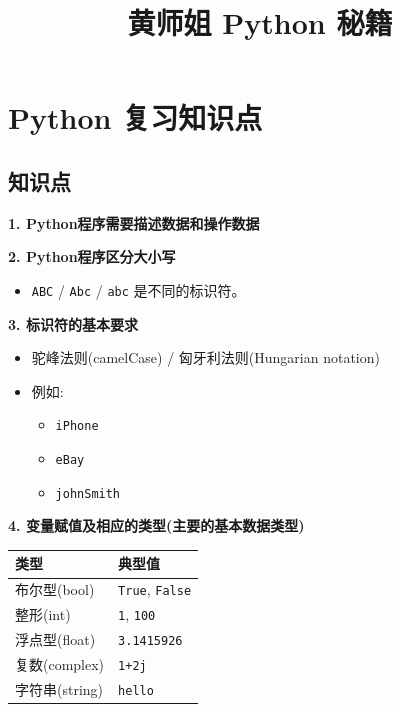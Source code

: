 \documentclass[11pt]{article}
\title{黄师姐 Python 秘籍}
\providecommand{\tightlist}{%
      \setlength{\itemsep}{0pt}\setlength{\parskip}{0pt}}
\begin{document}
    
    \maketitle
    
    

    
    \hypertarget{python-ux590dux4e60ux77e5ux8bc6ux70b9}{%
\section{Python
复习知识点}\label{python-ux590dux4e60ux77e5ux8bc6ux70b9}}

\hypertarget{ux77e5ux8bc6ux70b9}{%
\subsection{知识点}\label{ux77e5ux8bc6ux70b9}}

\textbf{1. Python程序需要描述数据和操作数据}

\textbf{2. Python程序区分大小写}

\begin{itemize}
\tightlist
\item
  \texttt{ABC} / \texttt{Abc} / \texttt{abc} 是不同的标识符。
\end{itemize}

\textbf{3. 标识符的基本要求}

\begin{itemize}
\tightlist
\item
  驼峰法则(camelCase) / 匈牙利法则(Hungarian notation)
\item
  例如:

  \begin{itemize}
  \tightlist
  \item
    \texttt{iPhone}
  \item
    \texttt{eBay}
  \item
    \texttt{johnSmith}
  \end{itemize}
\end{itemize}

\textbf{4. 变量赋值及相应的类型(主要的基本数据类型)}

    \begin{longtable}[]{@{}ll@{}}
\toprule
类型 & 典型值 \\
\midrule
\endhead
布尔型(bool) & \texttt{True}, \texttt{False} \\
整形(int) & \texttt{1}, \texttt{100} \\
浮点型(float) & \texttt{3.1415926} \\
复数(complex) & \texttt{1+2j} \\
字符串(string) & \texttt{\textquotesingle{}hello\textquotesingle{}} \\
\bottomrule
\end{longtable}
\end{document}
